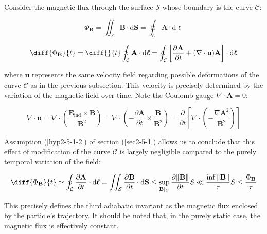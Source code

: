 Consider the magnetic flux through the surface $\mathcal{S}$ whose boundary is the curve $\mathcal{C}$:

\begin{equation}
    \Phi_\mathbf{B}=\iint_\mathcal{S}\mathbf{B}\cdot\mathrm{d}\mathbf{S}=\oint_\mathcal{C}\mathbf{A}\cdot\mathrm{d}\boldsymbol{\ell}
\end{equation}

\begin{equation}
    \diff{\Phi_\mathbf{B}}{t}=\diff{}{t}\oint_\mathcal{C}\mathbf{A}\cdot\mathrm{d}\boldsymbol{\ell}=\oint_\mathcal{C}\left[\frac{\partial\mathbf{A}}{\partial t}+(\nabla\cdot\mathbf{u})\mathbf{A}\right]\cdot\mathrm{d}\boldsymbol{\ell}
\end{equation}

where $\mathbf{u}$ represents the same velocity field regarding possible deformations of the curve $\mathcal{C}$ as in the previous subsection. This velocity is precisely determined by the variation of the magnetic field over time. Note the Coulomb gauge $\nabla\cdot\mathbf{A}=0$:

\begin{equation}
    \nabla\cdot\mathbf{u}=\nabla\cdot\left(\frac{\mathbf{E}_\text{ind}\times\mathbf{B}}{\mathbf{B}^2}\right)=\nabla\cdot\left(-\frac{\partial\mathbf{A}}{\partial t}\times\frac{\mathbf{B}}{\mathbf{B}^2}\right)=\frac{\partial}{\partial t}\left[\nabla\cdot\left(-\frac{\nabla\mathbf{A}^2}{\mathbf{B}^2}\right)\right]
\end{equation}

Assumption (\ref{hyp2-5-1-2}) of section (\ref{sec2-5-1}) allows us to conclude that this effect of modification of the curve $\mathcal{C}$ is largely negligible compared to the purely temporal variation of the field:

\begin{equation}
    \diff{\Phi_\mathbf{B}}{t}\simeq\oint_\mathcal{C}\frac{\partial\mathbf{A}}{\partial t}\cdot\mathrm{d}\boldsymbol{\ell}=\iint_\mathcal{S}\frac{\partial\mathbf{B}}{\partial t}\cdot\mathrm{d}\mathbf{S}\leq\sup_{\mathbf{B}|_\mathcal{S}}\frac{\partial\|\mathbf{B}\|}{\partial t}S\ll\frac{\inf\|\mathbf{B}\|}{\tau}S\leq\frac{\Phi_\mathbf{B}}{\tau}
\end{equation}

This precisely defines the third adiabatic invariant as the magnetic flux enclosed by the particle's trajectory. It should be noted that, in the purely static case, the magnetic flux is effectively constant.

